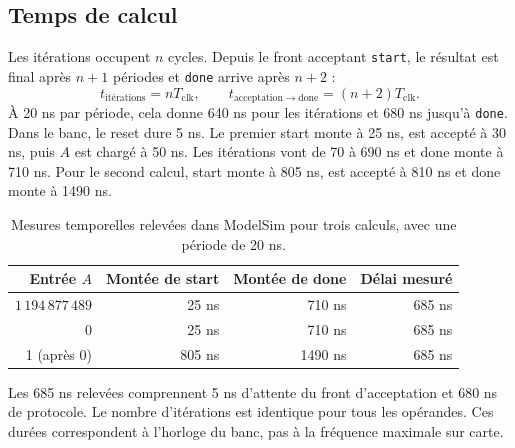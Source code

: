 \documentclass[a4paper,11pt]{article}
\begin{document}
\subsection*{Temps de calcul}
Les itérations occupent $n$ cycles. Depuis le front acceptant \texttt{start}, le résultat est final après $n+1$ périodes et \texttt{done} arrive après $n+2$ :
\[
t_{\mathrm{itérations}}=nT_{\mathrm{clk}},\qquad
 t_{\mathrm{acceptation}\rightarrow\mathrm{done}}=(n+2)T_{\mathrm{clk}}.
\]
À 20 ns par période, cela donne 640 ns pour les itérations et 680 ns jusqu’à \texttt{done}. Dans le banc, le reset dure 5 ns. Le premier start monte à 25 ns, est accepté à 30 ns, puis $A$ est chargé à 50 ns. Les itérations vont de 70 à 690 ns et done monte à 710 ns. Pour le second calcul, start monte à 805 ns, est accepté à 810 ns et done monte à 1490 ns.
\begin{table}[H]
\centering
\small
\renewcommand{\arraystretch}{1.15}
\begin{tabular}{@{}r r r r@{}}
\toprule
\textbf{Entrée $A$} & \textbf{Montée de start} & \textbf{Montée de done} & \textbf{Délai mesuré}\\
\midrule
$1\,194\,877\,489$ & 25 ns & 710 ns & 685 ns\\
0 & 25 ns & 710 ns & 685 ns\\
1 (après 0) & 805 ns & 1490 ns & 685 ns\\
\bottomrule
\end{tabular}
\caption{Mesures temporelles relevées dans ModelSim pour trois calculs, avec une période de 20 ns.}
\label{tab:temps-mesures}
\end{table}

Les 685 ns relevées comprennent 5 ns d’attente du front d’acceptation et 680 ns de protocole. Le nombre d’itérations est identique pour tous les opérandes. Ces durées correspondent à l’horloge du banc, pas à la fréquence maximale sur carte.

\clearpage
\end{document}

